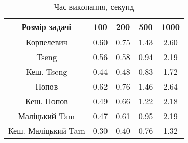 \begin{table}[H]
	\centering
	\begin{tabular}{|c||c|c|c|c|}\hline
		Розмір задачі & 100 & 200 & 500 & 1000 \\ \hline \hline
		Корпелевич & 0.60 & 0.75 & 1.43 & 2.60 \\ \hline
		Tseng & 0.56 & 0.58 & 0.94 & 2.19 \\ \hline
		Кеш. Tseng & 0.44 & 0.48 & 0.83 & 1.72 \\ \hline
		Попов & 0.62 & 0.76 & 1.46 & 2.64 \\ \hline
		Кеш. Попов & 0.49 & 0.66 & 1.22 & 2.18 \\ \hline
		Маліцький Tam & 0.47 & 0.61 & 0.95 & 2.19 \\ \hline
		Кеш. Маліцький Tam & 0.30 & 0.40 & 0.76 & 1.32 \\ \hline
	\end{tabular}
	\caption{Час виконання, секунд}
\end{table}
